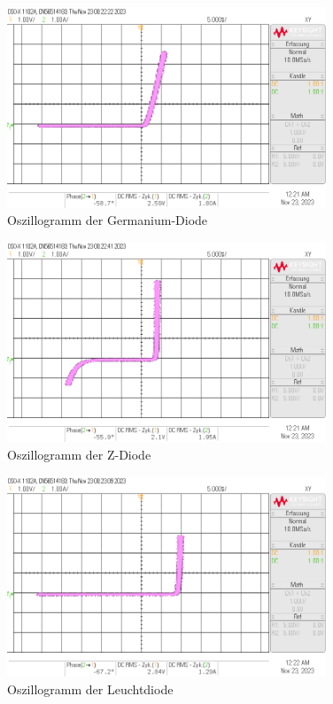 \begin{enumerate}[label=\alph*)]
	      \begin{figure}[h!]
		      \begin{center}
			      \includegraphics[width=0.85\textwidth]{img/V1/3.2.Diode_Ge.png}
			      \caption{Oszillogramm der Germanium-Diode}
		      \end{center}
	      \end{figure}

\pagebreak
	      \begin{figure}[h!]
		      \begin{center}
			      \includegraphics[width=0.85\textwidth]{img/V1/3.2.Diode_Ze.png}
			      \caption{Oszillogramm der Z-Diode}
		      \end{center}
	      \end{figure}

	      \begin{figure}[h!]
		      \begin{center}
			      \includegraphics[width=0.85\textwidth]{img/V1/3.2.Diode_Led.png}
			      \caption{Oszillogramm der Leuchtdiode}
		      \end{center}
	      \end{figure}
\end{enumerate}


